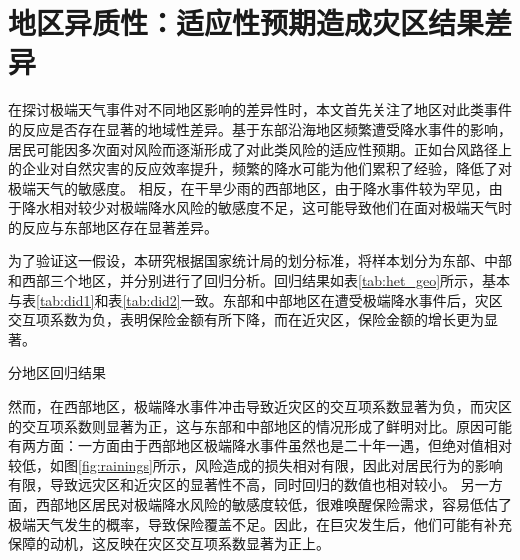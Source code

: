 \section{地区异质性：适应性预期造成灾区结果差异}
在探讨极端天气事件对不同地区影响的差异性时，本文首先关注了地区对此类事件的反应是否存在显著的地域性差异。基于东部沿海地区频繁遭受降水事件的影响，居民可能因多次面对风险而逐渐形成了对此类风险的适应性预期。正如台风路径上的企业对自然灾害的反应效率提升\citep{0Do}，频繁的降水可能为他们累积了经验，降低了对极端天气的敏感度\citep{陈思柳2021不同决策情境下的损失厌恶效应差异}。
相反，在干旱少雨的西部地区，由于降水事件较为罕见，由于降水相对较少对极端降水风险的敏感度不足，这可能导致他们在面对极端天气时的反应与东部地区存在显著差异。

为了验证这一假设，本研究根据国家统计局的划分标准，将样本划分为东部、中部和西部三个地区，并分别进行了回归分析。回归结果如表\ref{tab:het_geo}所示，基本与表\ref{tab:did1}和表\ref{tab:did2}一致。东部和中部地区在遭受极端降水事件后，灾区交互项系数为负，表明保险金额有所下降，而在近灾区，保险金额的增长更为显著。

\begin{table}
    \centering
    \caption{分地区回归结果}\label{tab:het_geo}
    
\end{table}

然而，在西部地区，极端降水事件冲击导致近灾区的交互项系数显著为负，而灾区的交互项系数则显著为正，这与东部和中部地区的情况形成了鲜明对比。原因可能有两方面：一方面由于西部地区极端降水事件虽然也是二十年一遇，但绝对值相对较低，如图\ref{fig:rainings}所示，风险造成的损失相对有限，因此对居民行为的影响有限，导致远灾区和近灾区的显著性不高，同时回归的数值也相对较小。
另一方面，西部地区居民对极端降水风险的敏感度较低，很难唤醒保险需求，容易低估了极端天气发生的概率\citep{tversky1973availability}，导致保险覆盖不足。因此，在巨灾发生后，他们可能有补充保障的动机，这反映在灾区交互项系数显著为正上。


